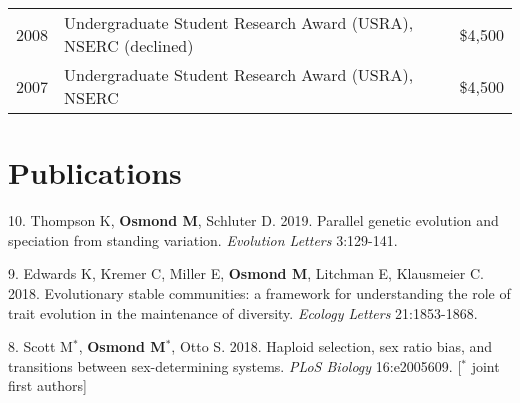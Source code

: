 \documentclass[12pt]{article}
\begin{document}
\begin{tabular}{llr}
  2008 & Undergraduate Student Research Award (USRA), NSERC (declined) & \$4,500\\
  2007 & Undergraduate Student Research Award (USRA), NSERC & \$4,500\\
\end{tabular}

\newpage
\section*{Publications}


\noindent\hspace{.1cm}10. Thompson K, \textbf{Osmond M}, Schluter D. 2019. Parallel genetic evolution and speciation from standing variation. \textit{Evolution Letters} 3:129-141.

\noindent\hspace{.1cm}9. Edwards K, Kremer C, Miller E, \textbf{Osmond M}, Litchman E, Klausmeier C. 2018. Evolutionary stable communities: a framework for understanding the role of trait evolution in the maintenance of diversity. \textit{Ecology Letters} 21:1853-1868.

\noindent\hspace{.1cm}8. Scott M$^*$, \textbf{Osmond M}$^*$, Otto S. 2018. Haploid selection, sex ratio bias, and transitions between sex-determining systems. \textit{PLoS Biology} 16:e2005609. [$^*$ joint first authors]
\end{document}
